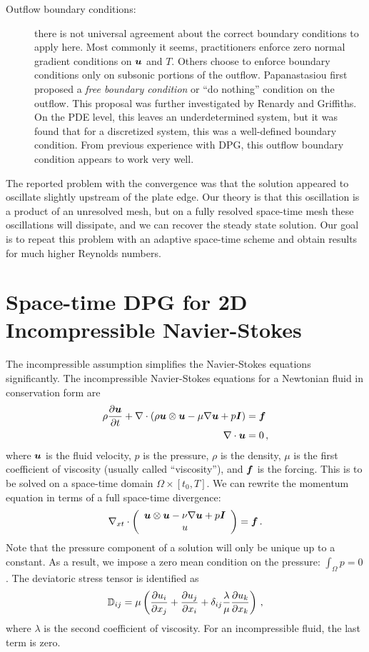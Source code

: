 \documentclass[Proposal.tex]{subfiles}
\begin{document}
\begin{description}
	\item[Outflow boundary conditions:] there is not universal agreement about the correct boundary conditions to apply here.
	Most commonly it seems, practitioners enforce zero normal gradient conditions on $\boldsymbol u$ and $T$. 
	Others choose to enforce boundary conditions only on subsonic portions of the outflow\cite{DemkowiczCNS1990}.
	Papanastasiou first proposed a \emph{free boundary condition} or ``do nothing'' condition on the outflow.
	This proposal was further investigated by Renardy\cite{Renardy1997} and Griffiths\cite{Griffiths1997}.
	On the PDE level, this leaves an underdetermined system, but it was found that for a discretized system, this was a well-defined boundary condition.
	From previous experience with DPG, this outflow boundary condition appears to work very well.
\end{description}

The reported problem with the convergence was that the solution appeared to oscillate slightly upstream of the plate edge.
Our theory is that this oscillation is a product of an unresolved mesh, but on a fully resolved space-time mesh these oscillations will dissipate, 
and we can recover the steady state solution.
Our goal is to repeat this problem with an adaptive space-time scheme and obtain results for much higher Reynolds numbers.

\section{Space-time DPG for 2D Incompressible Navier-Stokes}
The incompressible assumption simplifies the Navier-Stokes equations significantly.
The incompressible Navier-Stokes equations for a Newtonian fluid in conservation form are
\begin{align*}
  \rho\frac{\partial\boldsymbol u}{\partial t}+\nabla\cdot\left( \rho\boldsymbol u\otimes\boldsymbol u-\mu\nabla\boldsymbol u+p\boldsymbol I \right)&=\boldsymbol f\\
  \nabla\cdot\boldsymbol u&=0\,,
\end{align*}
where $\boldsymbol u$ is the fluid velocity, $p$ is the pressure, $\rho$ is the density, $\mu$ is the first coefficient of viscosity (usually called ``viscosity''), 
and $\boldsymbol f$ is the forcing. 
This is to be solved on a space-time domain $\Omega\times[t_0,T]$.
We can rewrite the momentum equation in terms of a full space-time divergence:
\begin{equation}
\nabla_{xt}\cdot\left( \begin{array}{c} \boldsymbol u\otimes\boldsymbol u-\nu\nabla\boldsymbol u+p\boldsymbol I\\ u\\ \end{array} \right)=\boldsymbol f\,.
\end{equation}
Note that the pressure component of a solution will only be unique up to a constant. 
As a result, we impose a zero mean condition on the pressure: $\int_\Omega p=0$.
The deviatoric stress tensor is identified as
\begin{equation}
	\mathbb{D}_{ij}=\mu\left( \frac{\partial u_i}{\partial x_j}+\frac{\partial u_j}{\partial x_i}
	+\delta_{ij}\frac{\lambda}{\mu}\frac{\partial u_k}{\partial x_k} \right)\,,
\end{equation}
where $\lambda$ is the second coefficient of viscosity.
For an incompressible fluid, the last term is zero.
\end{document}
